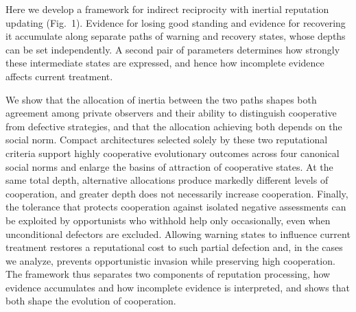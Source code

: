 \documentclass[11pt]{article}
\begin{document}
Here we develop a framework for indirect reciprocity with inertial reputation updating (Fig.~1). Evidence for losing good standing and evidence for recovering it accumulate along separate paths of warning and recovery states, whose depths can be set independently. A second pair of parameters determines how strongly these intermediate states are expressed, and hence how incomplete evidence affects current treatment.

We show that the allocation of inertia between the two paths shapes both agreement among private observers and their ability to distinguish cooperative from defective strategies, and that the allocation achieving both depends on the social norm. Compact architectures selected solely by these two reputational criteria support highly cooperative evolutionary outcomes across four canonical social norms and enlarge the basins of attraction of cooperative states. At the same total depth, alternative allocations produce markedly different levels of cooperation, and greater depth does not necessarily increase cooperation. Finally, the tolerance that protects cooperation against isolated negative assessments can be exploited by opportunists who withhold help only occasionally, even when unconditional defectors are excluded. Allowing warning states to influence current treatment restores a reputational cost to such partial defection and, in the cases we analyze, prevents opportunistic invasion while preserving high cooperation. The framework thus separates two components of reputation processing, how evidence accumulates and how incomplete evidence is interpreted, and shows that both shape the evolution of cooperation.



\end{document}
